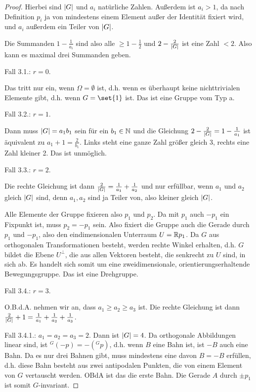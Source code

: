 \begin{proof}
Hierbei sind $\lvert G\rvert$ und $a_i$ natürliche Zahlen. Außerdem ist $a_i>1$, da nach Definition $p_i$ ja von mindestens einem Element außer der Identität fixiert wird, und $a_i$ außerdem ein Teiler von $\lvert G\rvert$.

Die Summanden $1-\frac{1}{a_i}$ sind also alle $\geq 1-\tfrac{1}{2}$ und $2-\frac{2}{\lvert G\rvert}$ ist eine Zahl $<2$. Also kann es maximal drei Summanden geben.

\smallbreak
Fall 3.1.: $r=0$.

Das tritt nur ein, wenn $\Omega=\emptyset$ ist, d.h. wenn es überhaupt keine nichttrivialen Elemente gibt, d.h. wenn $G=\set{1}$ ist. Das ist eine Gruppe vom Typ a.

\smallbreak
Fall 3.2.: $r=1$.

Dann muss $\lvert G\rvert=a_1b_1$ sein für ein $b_1\in\mathbb{N}$ und die Gleichung $2-\frac{2}{\lvert G\rvert} = 1-\frac{1}{a_1}$ ist äquivalent zu $a_1+1 = \frac{2}{b_1}$. Links steht eine ganze Zahl größer gleich $3$, rechts eine Zahl kleiner 2. Das ist unmöglich.

\smallbreak
Fall 3.3.: $r=2$.

Die rechte Gleichung ist dann $\frac{2}{\lvert G\rvert} = \frac{1}{a_1} + \frac{1}{a_2}$ und  nur erfüllbar, wenn $a_1$ und $a_2$ gleich $\lvert G\rvert$ sind, denn $a_1,a_2$ sind ja Teiler von, also kleiner gleich $\lvert G\rvert$.

Alle Elemente der Gruppe fixieren also $p_1$ und $p_2$. Da mit $p_1$ auch $-p_1$ ein Fixpunkt ist, muss $p_2=-p_1$ sein. Also fixiert die Gruppe auch die Gerade durch $p_1$ und $-p_1$, also den eindimensionalen Unterraum $U=\mathbb{R} p_1$. Da $G$ aus orthogonalen Transformationen besteht, werden rechte Winkel erhalten, d.h. $G$ bildet die Ebene $U^\perp$, die aus allen Vektoren besteht, die senkrecht zu $U$ sind, in sich ab. Es handelt sich somit um eine zweidimensionale, orientierungserhaltende Bewegungsgruppe. Das ist eine Drehgruppe.

\smallbreak
Fall 3.4.: $r=3$.

O.B.d.A. nehmen wir an, dass $a_1\geq a_2\geq a_3$ ist. Die rechte Gleichung ist dann $\frac{2}{\lvert G\rvert}+1=\frac{1}{a_1}+\frac{1}{a_2}+\frac{1}{a_3}$.

Fall 3.4.1.: $a_1=a_2=a_3=2$. Dann ist $\lvert G\rvert=4$. Da orthogonale Abbildungen linear sind, ist ${^G(-p)} = -(^G p)$, d.h. wenn $B$ eine Bahn ist, ist $-B$ auch eine Bahn. Da es nur drei Bahnen gibt, muss mindestens eine davon $B=-B$ erfüllen, d.h. diese Bahn besteht aus zwei antipodalen Punkten, die von einem Element von $G$ vertauscht werden. OBdA ist das die erste Bahn. Die Gerade $A$ durch $\pm p_1$ ist somit $G$-invariant.


\end{proof}
